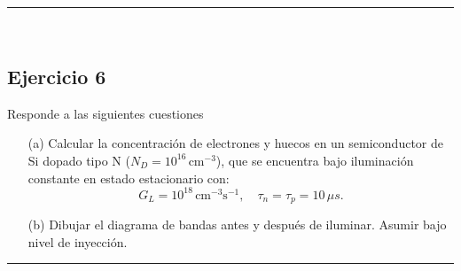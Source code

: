 \rule{\textwidth}{0.1pt} \\[2pt]
\subsection{Ejercicio 6}

Responde a las siguientes cuestiones
\begin{itemize}
	\item[(a)] Calcular la concentración de electrones y huecos en un semiconductor de Si dopado tipo N (\(N_D = 10^{16} \, \text{cm}^{-3}\)), que se encuentra bajo iluminación constante en estado estacionario con:
		  \[
			  G_L = 10^{18} \, \text{cm}^{-3}\text{s}^{-1}, \quad \tau_n = \tau_p = 10 \, \mu s.
		  \]
	\item[(b)] Dibujar el diagrama de bandas antes y después de iluminar. Asumir bajo nivel de inyección.
\end{itemize}



\rule{\textwidth}{0.1pt} \\[2pt]

